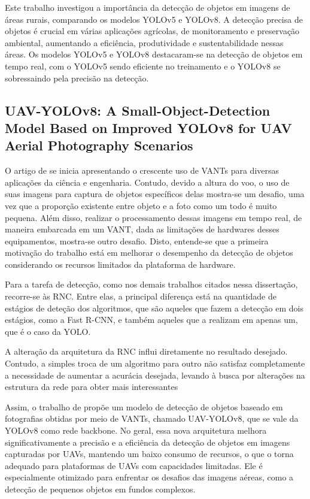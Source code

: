 Este trabalho investigou a importância da detecção de objetos em imagens de áreas rurais, comparando os modelos YOLOv5 e YOLOv8. A detecção precisa de objetos é crucial em várias aplicações agrícolas, de monitoramento e preservação ambiental, aumentando a eficiência, produtividade e sustentabilidade nessas áreas. Os modelos YOLOv5 e YOLOv8 destacaram-se na detecção de objetos em tempo real, com o YOLOv5 sendo eficiente no treinamento e o YOLOv8 se sobressaindo pela precisão na detecção.


\subsection{UAV-YOLOv8: A Small-Object-Detection Model Based on Improved YOLOv8 for UAV Aerial Photography Scenarios}

O artigo de \cite{wang2023uav} se inicia apresentando o crescente uso de VANTs para diversas aplicações da ciência e engenharia. Contudo, devido a altura do voo, o uso de suas imagens para captura de objetos específicos delas mostra-se um desafio, uma vez que a proporção existente entre objeto e a foto como um todo é muito pequena. Além disso, realizar o processamento dessas imagens em tempo real, de maneira embarcada em um VANT, dada as limitações de hardwares desses equipamentos, mostra-se outro desafio. Disto, entende-se que a primeira motivação do trabalho está em melhorar o desempenho da detecção de objetos considerando os recursos limitados da plataforma de hardware.

Para a tarefa de detecção, como nos demais trabalhos citados nessa dissertação, recorre-se às RNC. Entre elas, a principal diferença está na quantidade de estágios de deteção dos algoritmos, que são aqueles que fazem a detecção em dois estágios, como a Fast R-CNN, e também aqueles que a realizam em apenas um, que é o caso da YOLO\cite{girshick2015fast}.

A alteração da arquitetura da RNC influi diretamente no resultado desejado. Contudo, a simples troca de um algoritmo para outro não satisfaz completamente a necessidade de aumentar a acurácia desejada, levando à busca por alterações na estrutura da rede para obter mais interessantes

Assim, o trabalho de \cite{wang2023uav} propõe um modelo de detecção de objetos baseado em fotografias obtidas por meio de VANTs, chamado UAV-YOLOv8, que se vale da  YOLOv8 como rede backbone. No geral, essa nova arquitetura melhora significativamente a precisão e a eficiência da detecção de objetos em imagens capturadas por UAVs, mantendo um baixo consumo de recursos, o que o torna adequado para plataformas de UAVs com capacidades limitadas. Ele é especialmente otimizado para enfrentar os desafios das imagens aéreas, como a detecção de pequenos objetos em fundos complexos.

